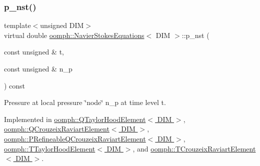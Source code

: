 \mbox{\label{classoomph_1_1NavierStokesEquations_a0a39f638a61fd9a6c999c16e94deb31b}} 
\subsubsection{\texorpdfstring{p\+\_\+nst()}{p\_nst()}\hspace{0.1cm}{\footnotesize\ttfamily [2/2]}}
{\footnotesize\ttfamily template$<$unsigned D\+IM$>$ \\
virtual double \hyperlink{classoomph_1_1NavierStokesEquations}{oomph\+::\+Navier\+Stokes\+Equations}$<$ D\+IM $>$\+::p\+\_\+nst (\begin{DoxyParamCaption}\item[{const unsigned \&}]{t,  }\item[{const unsigned \&}]{n\+\_\+p }\end{DoxyParamCaption}) const\hspace{0.3cm}{\ttfamily [pure virtual]}}



Pressure at local pressure \char`\"{}node\char`\"{} n\+\_\+p at time level t. 



Implemented in \hyperlink{classoomph_1_1QTaylorHoodElement_a8aa6aca4730dda3d3e9993e951fa6196}{oomph\+::\+Q\+Taylor\+Hood\+Element$<$ D\+I\+M $>$}, \hyperlink{classoomph_1_1QCrouzeixRaviartElement_ab7e5c4345c95002750592f7dcaa7a1c5}{oomph\+::\+Q\+Crouzeix\+Raviart\+Element$<$ D\+I\+M $>$}, \hyperlink{classoomph_1_1PRefineableQCrouzeixRaviartElement_a1a70b2251c5150e4719db4e26bbde7f0}{oomph\+::\+P\+Refineable\+Q\+Crouzeix\+Raviart\+Element$<$ D\+I\+M $>$}, \hyperlink{classoomph_1_1TTaylorHoodElement_aa04b4b4ec9d1e04f4d6b6bb00c8fa629}{oomph\+::\+T\+Taylor\+Hood\+Element$<$ D\+I\+M $>$}, and \hyperlink{classoomph_1_1TCrouzeixRaviartElement_adc29dd0f602b9958c5e3f34518ba35ae}{oomph\+::\+T\+Crouzeix\+Raviart\+Element$<$ D\+I\+M $>$}.

\mbox{\label{classoomph_1_1NavierStokesEquations_ae3a5de7bed7c884731e3bb2afc437758}} 

